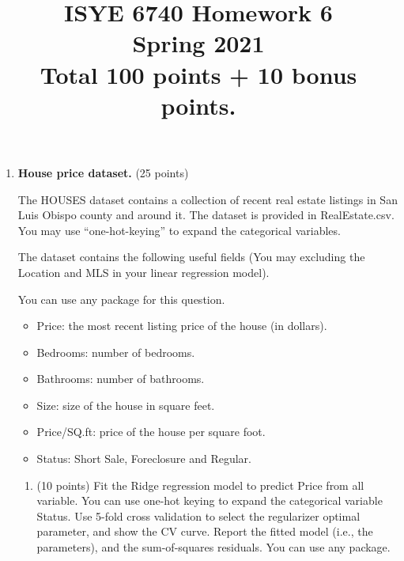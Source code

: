 \documentclass[twoside,10pt]{article}
\begin{document}
\title{ISYE 6740 Homework 6\\ 
Spring 2021\\ 
\small Total 100 points + 10 bonus points.}
\date{}
\maketitle






\begin{enumerate}

\item {\bf House price dataset.} (25 points)

The HOUSES dataset contains a collection of recent real estate listings in San Luis Obispo county and around it. The dataset is provided in RealEstate.csv. You may use ``one-hot-keying'' to expand the categorical variables.

The dataset contains the following useful fields (You may excluding the \textsf{Location} and \textsf{MLS} in your linear regression model). 

You can use any package for this question.

\begin{itemize}
\item Price: the most recent listing price of the house (in dollars).
\item Bedrooms: number of bedrooms.
\item Bathrooms: number of bathrooms.
\item Size: size of the house in square feet.
\item Price/SQ.ft: price of the house per square foot.
\item Status: Short Sale, Foreclosure and Regular.
\end{itemize}

\begin{enumerate}

\item (10 points) Fit the Ridge regression model to predict \textsf{Price} from all variable. You can use one-hot keying to expand the categorical variable \textsf{Status}. Use 5-fold cross validation to select the regularizer optimal parameter, and show the CV curve. Report the fitted model (i.e., the parameters), and the sum-of-squares residuals.  You can use any package.
 

\end{enumerate}
\end{enumerate}
\end{document}
